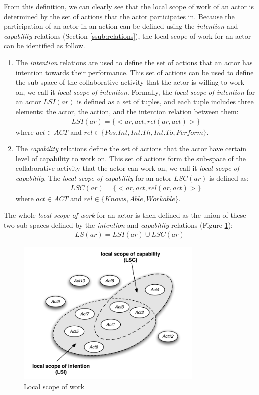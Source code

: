 From this definition, we can clearly see that the local scope of work of an actor is determined by the set of actions that the actor participates in. Because the participation of an actor in an action can be defined using the \emph{intention} and \emph{capability} relations (Section \ref{ssub:relations}), the local scope of work for an actor can be identified as follow. 

\begin{enumerate}
	\item The \emph{intention} relations are used to define the set of actions that an actor has intention towards their performance. This set of actions can be used to define the sub-space of the collaborative activity that the actor is willing to work on, we call it \emph{local scope of intention}. Formally, the \emph{local scope of intention} for an actor $LSI(ar)$ is defined as a set of tuples, and each tuple includes three elements: the actor, the action, and the intention relation between them:
		\begin{align*} 
			LSI(ar) = \{<ar, act, rel(ar, act)>\}
		\end{align*}
		where $act\in ACT$ and $rel\in \{Pos.Int, Int.Th, Int.To, Perform\}$.
	\item The \emph{capability} relations define the set of actions that the actor have certain level of capability to work on. This set of actions form the sub-space of the collaborative activity that the actor can work on, we call it \emph{local scope of capability}. The \emph{local scope of capability} for an actor $LSC(ar)$ is defined as:
		\begin{align*} 
			LSC(ar) = \{<ar, act, rel(ar, act)>\}
		\end{align*}
		where $act\in ACT$ and $rel\in \{Knows, Able, Workable\}$.
\end{enumerate}

The whole \emph{local scope of work} for an actor is then defined as the union of these two sub-spaces defined by the \emph{intention} and \emph{capability} relations (Figure \ref{fig:local_scope}):
\begin{align*} 
	LS(ar) = LSI(ar) \cup LSC(ar)
\end{align*}

\begin{figure}[htbp] %
   \centering
   \includegraphics[width=3.5in]{local_scope.pdf} 
   \caption{Local scope of work}
   \label{fig:local_scope}
\end{figure}

